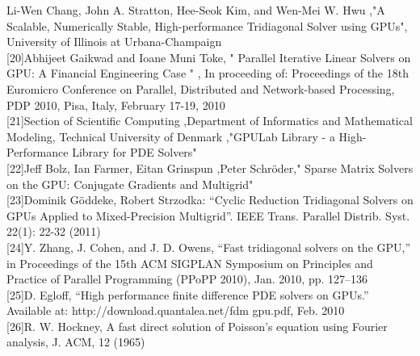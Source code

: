 \begin{singlespace}
[19]Li-Wen Chang, John A. Stratton, Hee-Seok Kim, and Wen-Mei W. Hwu ,"A Scalable, Numerically Stable, High-performance Tridiagonal Solver using GPUs", University of Illinois at Urbana-Champaign\\

[20]Abhijeet Gaikwad and Ioane Muni Toke, " Parallel Iterative Linear Solvers on GPU: A Financial Engineering Case " , In proceeding of: Proceedings of the 18th Euromicro Conference on Parallel, Distributed and Network-based Processing, PDP 2010, Pisa, Italy, February 17-19, 2010\\

[21]Section of Scientific Computing ,Department of Informatics and Mathematical Modeling, Technical University of Denmark ,"GPULab Library - a High-Performance Library for PDE Solvers"\\

[22]Jeff Bolz, Ian Farmer, Eitan Grinspun ,Peter Schröder," Sparse Matrix Solvers on the GPU: Conjugate Gradients and Multigrid"\\

[23]Dominik Göddeke, Robert Strzodka: “Cyclic Reduction Tridiagonal Solvers on GPUs Applied to Mixed-Precision Multigrid”.  IEEE Trans. Parallel Distrib. Syst. 22(1): 22-32 (2011)\\

[24]Y. Zhang, J. Cohen, and J. D. Owens, “Fast tridiagonal solvers on the GPU,” in Proceedings of the 15th ACM SIGPLAN Symposium on Principles and Practice of Parallel Programming (PPoPP 2010), Jan. 2010, pp. 127–136\\

[25]D. Egloff, “High performance ﬁnite difference PDE solvers on GPUs.” 
Available at: http://download.quantalea.net/fdm gpu.pdf, Feb. 2010\\

[26]R. W. Hockney, A fast direct solution of Poisson’s equation using Fourier analysis, J. ACM, 12 (1965)\\


\end{singlespace}
